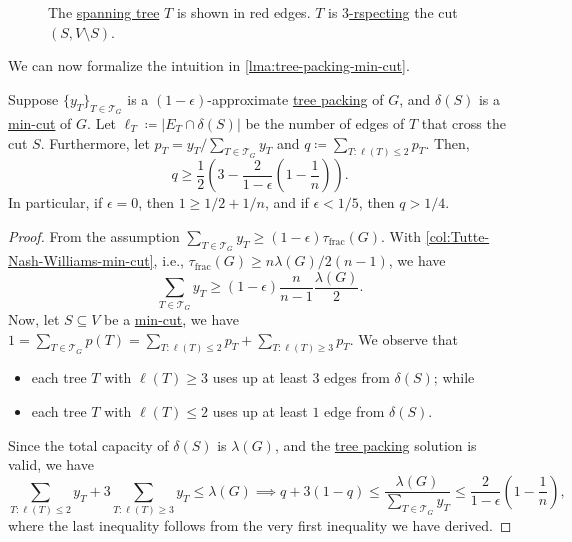\begin{figure}[H]
	\centering
	\caption{The \hyperref[def:spanning-tree]{spanning tree} \(T\) is shown in red edges. \(T\) is \hyperref[def:respect]{\(3\)-rspecting} the cut \((S, V \setminus S)\).}
\end{figure}

We can now formalize the intuition in \autoref{lma:tree-packing-min-cut}.

\begin{lemma}\label{lma:tree-packing-min-cut}
	Suppose \(\{ y_T \} _{T \in \mathcal{T} _G}\) is a \((1 - \epsilon )\)-approximate \hyperref[prb:TP]{tree packing} of \(G\), and \(\delta (S)\) is a \hyperref[prb:global-min-cut]{min-cut} of \(G\). Let \(\ell _T \coloneqq \lvert E_T \cap \delta (S) \rvert \) be the number of edges of \(T\) that cross the cut \(S\). Furthermore, let \(p_T = y_T / \sum_{T\in \mathcal{T} _G} y_T \) and \(q \coloneqq \sum_{T \colon \ell (T) \leq 2} p_T \). Then,
	\[
		q \geq \frac{1}{2} \left( 3 - \frac{2}{1 - \epsilon } \left( 1 - \frac{1}{n} \right) \right) .
	\]
	In particular, if \(\epsilon = 0\), then \(1 \geq 1 / 2 + 1 / n\), and if \(\epsilon < 1 / 5\), then \(q > 1 / 4\).
\end{lemma}
\begin{proof}
	From the assumption \(\sum_{T \in \mathcal{T} _G} y_T \geq (1 - \epsilon ) \tau _{\text{frac} } (G)\). With \autoref{col:Tutte-Nash-Williams-min-cut}, i.e., \(\tau _{\text{frac} }(G) \geq n \lambda (G) / 2 (n-1)\), we have
	\[
		\sum_{T \in \mathcal{T} _G} y_T
		\geq (1 - \epsilon ) \frac{n}{n-1} \frac{\lambda (G)}{2}.
	\]
	Now, let \(S \subseteq V\) be a \hyperref[prb:global-min-cut]{min-cut}, we have \(1 = \sum_{T \in \mathcal{T} _G} p(T) = \sum_{T \colon \ell (T) \leq 2} p_T + \sum_{T \colon \ell (T) \geq 3} p_T\). We observe that
	\begin{itemize}
		\item each tree \(T\) with \(\ell (T) \geq 3\) uses up at least \(3\) edges from \(\delta (S)\); while
		\item each tree \(T\) with \(\ell (T) \leq 2\) uses up at least \(1\) edge from \(\delta (S)\).
	\end{itemize}
	Since the total capacity of \(\delta (S)\) is \(\lambda (G)\), and the \hyperref[prb:TP]{tree packing} solution is valid, we have
	\[
		\sum_{T \colon \ell (T) \leq 2} y_T + 3 \sum_{T \colon \ell (T) \geq 3} y_T
		\leq \lambda (G)
		\implies q + 3 (1 - q)
		\leq \frac{\lambda (G)}{\sum_{T \in \mathcal{T} _G} y_T}
		\leq \frac{2}{1 - \epsilon } \left( 1 - \frac{1}{n} \right) ,
	\]
	where the last inequality follows from the very first inequality we have derived.
\end{proof}


